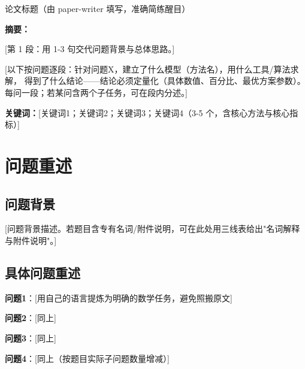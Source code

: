 \documentclass[12pt,a4paper]{ctexart}
\begin{document}
\begin{center}
    {\heiti 论文标题（由 paper-writer 填写，准确简练醒目）}
\end{center}

\bigskip

\noindent\textbf{摘要：}

[第 1 段：用 1-3 句交代问题背景与总体思路。]

[以下按问题逐段：针对问题X，建立了什么模型（方法名），用什么工具/算法求解，
得到了什么结论——结论必须定量化（具体数值、百分比、最优方案参数）。
每问一段；若某问含两个子任务，可在段内分述。]

\bigskip

\noindent\textbf{关键词：}[关键词1；关键词2；关键词3；关键词4（3-5 个，含核心方法与核心指标）]

\newpage

\section{问题重述}

\subsection{问题背景}

[问题背景描述。若题目含专有名词/附件说明，可在此处用三线表给出"名词解释与附件说明"。]

\subsection{具体问题重述}

\textbf{问题1}：[用自己的语言提炼为明确的数学任务，避免照搬原文]

\textbf{问题2}：[同上]

\textbf{问题3}：[同上]

\textbf{问题4}：[同上（按题目实际子问题数量增减）]

\end{document}
